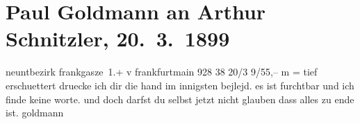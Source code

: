 

         
         \renewcommand{\erwaehntePersonen}{Personen:  Ulrich}
         \renewcommand{\erwaehnteOrte}{Orte: Frankfurt am Main, Frankgasse, IX., Alsergrund, Wien}
         \renewcommand{\erwaehnteWerke}{}
               \section[Paul Goldmann an Arthur Schnitzler, 20. 3. 1899]{ Paul Goldmann an Arthur Schnitzler, 20. 3. 1899}\nopagebreak{}\rehead{ }\begin{ledgroupsized}[t]{13cm}\normalsize\beginnumbering \toendnotes[C]{\smallbreak\pagebreak[2]} 
\pstart{}{\pb}neuntbezirk frankgasze 1.+\pend{}{\bigskip}\pstart
           \noindent{}\centering{}{\pb}v frankfurtmain
               928 38 20/3{ }9/55,– m =\pend
           \pstart
           \noindent{}tief erschuettert druecke ich dir die hand im innigsten bejlejd. es ist furchtbar und
               ich finde keine worte. und doch darfst du selbst jetzt nicht glauben dass alles zu
               ende ist. \spacefill\mbox{goldmann}\pend
           
         
         \endnumbering{}\end{ledgroupsized}  \newcommand{\dateiname}{L02680}\newcommand{\titel}{Paul Goldmann an Arthur Schnitzler, 20. 3. 1899}\newcommand{\editorInnen}{Martin Anton Müller und Laura Untner}
      